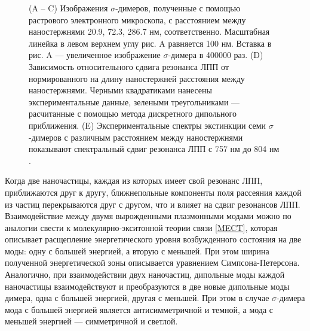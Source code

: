 \begin{figure}[t]
\caption{(A -- C) Изображения $ \sigma $-димеров, полученные с помощью растрового электронного микроскопа, с расстоянием между наностержнями 20.9, 72.3, 286.7 нм, соответственно. Масштабная линейка в левом верхнем углу рис. A равняется 100 нм. Вставка в рис. A --- увеличенное изображение $ \sigma $-димера в 400000 раз. (D) Зависимость относительного сдвига резонанса ЛПП от нормированного на длину наностержней расстояния между наностержнями. Черными квадратиками нанесены экспериментальные данные, зелеными треугольниками --- расчитанные с помощью метода дискретного дипольного приближения. (E) Экспериментальные спектры экстинкции семи $ \sigma $-димеров с различным расстоянием между наностержнями показывают спектральный сдвиг резонанса ЛПП с 757 нм до 804 нм \cite{nanorods2}.}
\label{img:PR_nanorods}
\end{figure}

Когда две наночастицы, каждая из которых имеет свой резонанс ЛПП, приближаются друг к другу, ближнепольные компоненты поля рассеяния каждой из частиц перекрываются друг с другом, что и влияет на сдвиг резонансов ЛПП. Взаимодействие между двумя вырожденными плазмонными модами можно по аналогии свести к молекулярно-экситонной теории связи \ref{MECT}, которая описывает расщепление энергетического уровня возбужденного состояния на две моды: одну с большей энергией, а вторую с меньшей. При этом ширина полученной энергетической зоны описывается уравнением Симпсона-Петерсона. Аналогично, при взаимодействии двух наночастиц, дипольные моды каждой наночастицы взаимодействуют и преобразуются в две новые дипольные моды димера, одна с большей энергией, другая с меньшей. При этом в случае $ \sigma $-димера мода с большей энергией является антисимметричной и темной, а мода с меньшей энергией --- симметричной и светлой.

